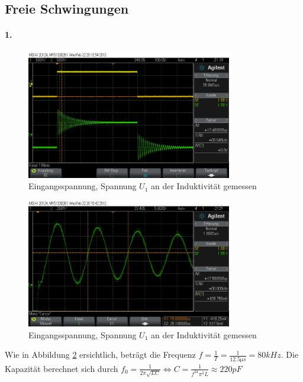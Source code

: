 \documentclass[a4paper]{article}
\begin{document}
\subsection{Freie Schwingungen}
\paragraph{1.}
\begin{figure}[H]
    \centering
    \includegraphics[width=0.8\textwidth]{versuch2_1.png}
    \caption{Eingangsspannung, Spannung $U_1$ an der Induktivität gemessen}
    \label{fig:versuch2-1}
\end{figure}

\begin{figure}[H]
    \centering
    \includegraphics[width=0.8\textwidth]{versuch2_1_frequenz.png}
    \caption{Eingangsspannung, Spannung $U_1$ an der Induktivität gemessen}
    \label{fig:versuch2-1-frequenz}
\end{figure}

Wie in Abbildung \ref{fig:versuch2-1-frequenz} ersichtlich, beträgt die Frequenz $f=\frac{1}{T}=\frac{1}{12.5\si{\micro s}}=80\si{kHz}$.
Die Kapazität berechnet sich durch $f_0=\frac{1}{2\pi\sqrt{LC}}\Leftrightarrow C=\frac{1}{f^24\pi^2L}\approx 220\si{pF}$
\end{document}
